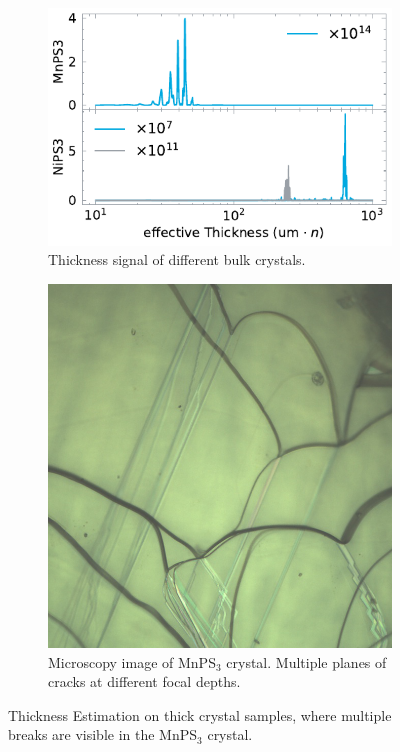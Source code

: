 \documentclass[
	twoside,
	parskip=half,
	a4paper,
]{scrbook}
\begin{document}
\begin{figure}
	\begin{subfigure}[t]{3.5in}
		\vskip 0pt
		\centering
		\includegraphics{../figures/2024-03-14 thickness.pdf}
		\caption{Thickness signal of different bulk crystals.}
		\label{fig:thickness bulk}
	\end{subfigure}
	\begin{subfigure}[t]{.3\textwidth}
		\vskip 4pt
		\centering
		\includegraphics[width=\textwidth]{../../data/2023-11-02/i001_MnPS3_50x_a.png}
		\caption{Microscopy image of MnPS$_3$ crystal. Multiple planes of cracks at different focal depths.}
		\label{fig:thickness MnPS3}
	\end{subfigure}
	\caption{Thickness Estimation on thick crystal samples, where multiple breaks are visible in the MnPS$_3$ crystal.} 
\end{figure}
\end{document}
